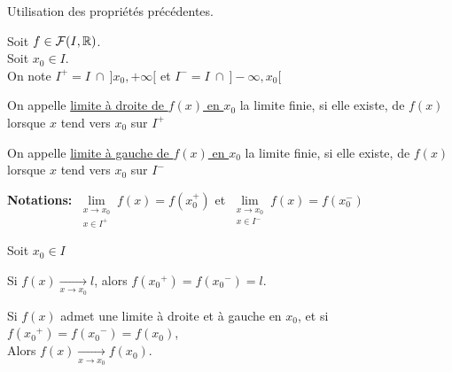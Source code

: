\documentclass[12pt,twoside,a4paper]{article}
\begin{document}
		\begin{prop}
			Utilisation des propriétés précédentes.
		\end{prop}
		\begin{defi}
			Soit $f\in\mathcal{F}(I,\mathbb{R})$.\\
			Soit $x_0\in I$.\\
			On note $I^{+}=I\ \cap\  ]x_0,+\infty[$ et $I^{-}=I\ \cap\  ]-\infty,x_0[$
			\begin{liste}
				\item On appelle \underline{limite \`a droite de $f(x)$ en $x_0$} la limite finie, si elle existe, de $f(x)$ lorsque $x$ tend vers $x_0$ sur $I^{+}$
				\item On appelle \underline{limite \`a gauche de $f(x)$ en $x_0$} la limite finie, si elle existe, de $f(x)$ lorsque $x$ tend vers $x_0$ sur $I^{-}$
			\end{liste}
		\end{defi}
		\begin{flushleft}
			\textbf{Notations:} $\lim\limits_{\substack{x\rightarrow x_0\\x\in I^{+}}} f(x) = f(x_0^{+})$ et $\lim\limits_{\substack{x\rightarrow x_0\\x\in I^{-}}} f(x) = f(x_0^{-})$
		\end{flushleft}
		\begin{prop}
			Soit $x_0\in I$
			\begin{liste}
				\item Si $f(x) \mathop{\longrightarrow}\limits_{x\rightarrow x_0} l$, alors $f({x_0}^{+})=f({x_0}^{-})=l$.
				\item Si $f(x)$ admet une limite \`a droite et \`a gauche en $x_0$, et si $f({x_0}^{+})=f({x_0}^{-})=f(x_0)$,\\
				Alors $f(x) \mathop{\longrightarrow}\limits_{x\rightarrow x_0} f(x_0)$.
			\end{liste}
		\end{prop}
\end{document}
